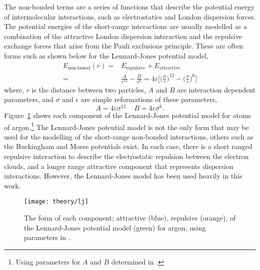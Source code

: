 The non-bonded terms are a series of functions that describe the potential energy of intermolecular interactions, such as electrostatics and London dispersion forces.
The potential energies of the short-range interactions are usually modelled as a combination of the attractive London dispersion interaction and the repulsive exchange forces that arise from the Pauli exclusions principle.\autocite{leach_molecular_1996}
These are often forms such as shown below for the Lennard-Jones potential model,\autocite{lennard-jones_determination_1924}
%
\begin{equation}
\begin{aligned}
  E_{\text{non-boned}}(r) = & E_{\text{repulsive}} + E_{\text{attractive}} \\
  = & \frac{A}{r^{12}} - \frac{B}{r^6} = 4\varepsilon\Bigg[\bigg(\frac{\sigma}{r}\bigg)^{12} - \bigg(\frac{\sigma}{r}\bigg)^6\Bigg]
\end{aligned}
\end{equation}
%
where, $r$ is the distance between two particles, $A$ and $B$ are interaction dependent parameters, and $\sigma$ and $\epsilon$ are simple reformations of these parameters,
%
\begin{equation}
  A = 4\varepsilon\sigma^{12} \;\;\;\; B = 4\varepsilon\sigma^6.
\end{equation}
%
Figure~\ref{fig:lj} shows each component of the Lennard-Jones potential model for atoms of argon.\footnote{Using parameters for $A$ and $B$ determined in \cite{rahman_correlations_1964}.}
The Lennard-Jones potential model is not the only form that may be used for the modelling of the short-range non-bonded interactions, others such as the Buckingham and Morse potentials exist.\autocite{buckingham_classical_1938, morse_diatomic_1929}
In each case, there is a short ranged repulsive interaction to describe the electrostatic repulsion between the electron clouds, and a longer range attractive component that represents dispersion interactions.
However, the Lennard-Jones model has been used heavily in this work.
%
\begin{figure}
    \centering
    \texttt{[image: theory/lj]}
    \caption{The form of each component; attractive (blue), repulsive (orange), of the Lennard-Jones potential model (green) for argon, using parameters in \cite{rahman_correlations_1964}.}
    \label{fig:lj}
\end{figure}
%

